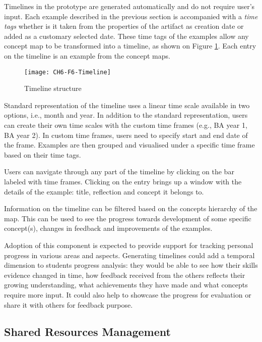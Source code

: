 Timelines in the prototype are generated automatically and do not require
user's input. Each example described in the previous section is accompanied with
a \textit{time tags} whether is it taken from the properties of the artifact as
creation date or added as a customary selected date. These time tags of the
examples allow any concept map to be transformed into a timeline, as shown on
Figure \ref{fig:timeline}. Each entry on the timeline is an example from the
concept maps.

\begin{figure}[htb]
\centering 
\texttt{[image: CH6-F6-Timeline]}
\caption{Timeline structure}
\label{fig:timeline}
\end{figure}

Standard representation of the timeline uses a linear time scale available in
two options, i.e., month and year. In addition to the standard representation,
users can create their own time scales with the custom time frames (e.g., BA
year 1, BA year 2). In custom time frames, users need to specify start and end
date of the frame. Examples are then grouped and visualised under a specific
time frame based on their time tags. 

Users can navigate through any part of the timeline by clicking on the bar
labeled with time frames. Clicking on the entry brings up a window with the
details of the example: title, reflection and concept it belongs to.

Information on the timeline can be filtered based on the concepts hierarchy of
the map. This can be used to see the progress towards development of some
specific concept(s), changes in feedback and improvements of the examples.

Adoption of this component is expected to provide support for tracking personal
progress in various areas and aspects. Generating timelines could add a temporal
dimension to students progress analysis: they would be able to see how their
skills evidence changed in time, how feedback received from the others reflects
their growing understanding, what achievements they have made and what concepts
require more input. It could also help to showcase the progress for evaluation
or share it with others for feedback purpose.

\subsection{Shared Resources Management}
\label{sec:sharing}

